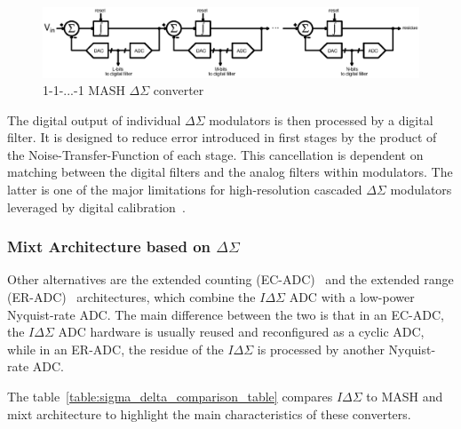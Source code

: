 \begin{figure}[htp]
    \centering
    \includegraphics[width=\textwidth]{Chapter2/Figs/Vector/sigma-delta-mash.ps}
    \caption{1-1-...-1 MASH $\Delta\Sigma$ converter}
    \label{fig:multi-bit}
\end{figure}

The digital output of individual \(\Delta\Sigma \) modulators is then processed by a digital filter. It is designed to reduce error introduced in first stages by the product of the Noise-Transfer-Function of each stage. This cancellation is dependent on matching between the digital filters and the analog filters within modulators. The latter is one of the major limitations for high-resolution cascaded \(\Delta\Sigma \) modulators leveraged by digital calibration~\cite{Cauwenberghs2000}.

\subsubsection{Mixt Architecture based on $\Delta\Sigma$}
Other alternatives are the extended counting (EC-ADC)~\cite{Jeon2017,Baird1995,Chen2016} and the extended range (ER-ADC)~\cite{Agah2010,Rossi2009} architectures, which combine the \(I\Delta\Sigma \) ADC with a low-power Nyquist-rate ADC\@. The main difference between the two is that in an EC-ADC, the \(I\Delta\Sigma \) ADC hardware is usually reused and reconfigured as a cyclic ADC, while in an ER-ADC, the residue  of the \(I\Delta\Sigma \) is processed by another Nyquist-rate ADC\@.

The table~\ref{table:sigma_delta_comparison_table} compares \(I\Delta\Sigma \) to MASH and mixt architecture to highlight the main characteristics of these converters.


